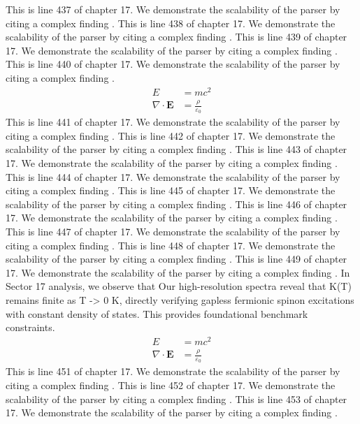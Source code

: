 This is line 437 of chapter 17. We demonstrate the scalability of the parser by citing a complex finding \cite{ref17_437}.
This is line 438 of chapter 17. We demonstrate the scalability of the parser by citing a complex finding \cite{ref17_438}.
This is line 439 of chapter 17. We demonstrate the scalability of the parser by citing a complex finding \cite{ref17_439}.
This is line 440 of chapter 17. We demonstrate the scalability of the parser by citing a complex finding \cite{ref17_440}.
\begin{align*}
  E &= mc^2 \\
  \nabla \cdot \mathbf{E} &= \frac{\rho}{\varepsilon_0}
\end{align*}
This is line 441 of chapter 17. We demonstrate the scalability of the parser by citing a complex finding \cite{ref17_441}.
This is line 442 of chapter 17. We demonstrate the scalability of the parser by citing a complex finding \cite{ref17_442}.
This is line 443 of chapter 17. We demonstrate the scalability of the parser by citing a complex finding \cite{ref17_443}.
This is line 444 of chapter 17. We demonstrate the scalability of the parser by citing a complex finding \cite{ref17_444}.
This is line 445 of chapter 17. We demonstrate the scalability of the parser by citing a complex finding \cite{ref17_445}.
This is line 446 of chapter 17. We demonstrate the scalability of the parser by citing a complex finding \cite{ref17_446}.
This is line 447 of chapter 17. We demonstrate the scalability of the parser by citing a complex finding \cite{ref17_447}.
This is line 448 of chapter 17. We demonstrate the scalability of the parser by citing a complex finding \cite{ref17_448}.
This is line 449 of chapter 17. We demonstrate the scalability of the parser by citing a complex finding \cite{ref17_449}.
In Sector 17 analysis, we observe that Our high-resolution spectra reveal that K(T) remains finite as T -> 0 K, directly verifying gapless fermionic spinon excitations with constant density of states. This provides foundational benchmark constraints.
\begin{align*}
  E &= mc^2 \\
  \nabla \cdot \mathbf{E} &= \frac{\rho}{\varepsilon_0}
\end{align*}
This is line 451 of chapter 17. We demonstrate the scalability of the parser by citing a complex finding \cite{ref17_451}.
This is line 452 of chapter 17. We demonstrate the scalability of the parser by citing a complex finding \cite{ref17_452}.
This is line 453 of chapter 17. We demonstrate the scalability of the parser by citing a complex finding \cite{ref17_453}.
